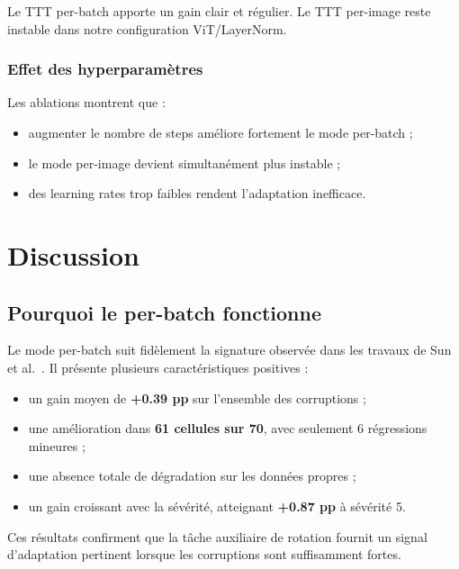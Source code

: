 \documentclass[12pt,a4paper]{report}
\begin{document}
	Le TTT per-batch apporte un gain clair et régulier.  
	Le TTT per-image reste instable dans notre configuration ViT/LayerNorm.
	
	\subsection{Effet des hyperparamètres}
	Les ablations montrent que :
	\begin{itemize}
		\item augmenter le nombre de steps améliore fortement le mode per-batch ;
		\item le mode per-image devient simultanément plus instable ;
		\item des learning rates trop faibles rendent l'adaptation inefficace.
	\end{itemize}
	\chapter{Discussion}
	
	\section{Pourquoi le per-batch fonctionne}
	Le mode per-batch suit fidèlement la signature observée dans les travaux de Sun et al.~\cite{Sun2020}.  
	Il présente plusieurs caractéristiques positives :
	\begin{itemize}
		\item un gain moyen de \textbf{+0.39 pp} sur l’ensemble des corruptions ;
		\item une amélioration dans \textbf{61 cellules sur 70}, avec seulement 6 régressions mineures ;
		\item une absence totale de dégradation sur les données propres ;
		\item un gain croissant avec la sévérité, atteignant \textbf{+0.87 pp} à sévérité 5.
	\end{itemize}
	Ces résultats confirment que la tâche auxiliaire de rotation fournit un signal d’adaptation pertinent lorsque les corruptions sont suffisamment fortes.
	
\end{document}

